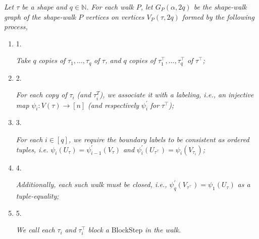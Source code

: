 \documentclass[10pt,a4paper]{article}
\begin{document}
\emph{Let $\tau$ be a shape and $q\in\mathbb{N}$. For each walk $P$, let $G_{P}(\alpha,2q)$ be the shape-walk graph of the shape-walk $P$ vertices on vertices $V_{P}(\tau,2q)$ formed by the following process,}\par


\begin{enumerate}


\item[] 
1. 


\emph{Take }$q$\emph{ copies of }$\tau_{1},\dots,\tau_{q}$\emph{ of }$\tau$\emph{, and }$q$\emph{ copies of }$\tau_{1}^{\top},\dots,\tau_{q}^{\top}$\emph{ of }$\tau^{\top}$\emph{;}\par





\item[] 
2. 


\emph{For each copy of }$\tau_{i}$\emph{ (and }$\tau_{i}^{T}$\emph{), we associate it with a labeling, i.e., an injective map }$\psi_{i}:V(\tau)\rightarrow[n]$\emph{ (and respectively }$\psi_{i}^{\prime}$\emph{ for }$\tau^{\top}$\emph{);}\par





\item[] 
3. 


\emph{For each }$i\in[q]$\emph{, we require the boundary labels to be consistent as ordered tuples, i.e. }$\psi_{i}(U_{\tau})=\psi^{\prime}_{i-1}(V_{\tau})$\emph{ and }$\psi^{\prime}_{i}(U_{\tau^{\top}})=\psi_{i}(V_{\tau_{i}})$\emph{;}\par





\item[] 
4. 


\emph{Additionally, each such walk must be closed, i.e., }$\psi^{\prime}_{q}(V_{\tau^{\top}})=\psi_{1}(U_{\tau})$\emph{ as a tuple-equality;}\par





\item[] 
5. 


\emph{We call each }$\tau_{i}$\emph{ and }$\tau^{\top}_{i}$\emph{ block a }BlockStep\emph{ in the walk.}\par





\end{enumerate}
\end{document}
